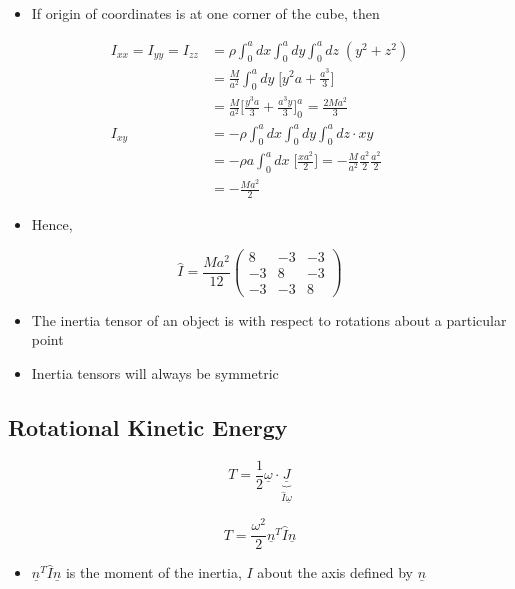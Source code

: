 \documentclass[a4paper,11pt,normalem]{article}
\begin{document}
\begin{example}
\begin{itemize}
\item
  If origin of coordinates is at one corner of the cube, then
\end{itemize}

\[
    \begin{aligned}
    I_{xx} = I_{yy} = I_{zz} &= \rho \int_0^a dx \int_0^a dy \int_0^a dz \;(y^2 + z^2) \\
    &= \frac{M}{a^2} \int_0^a dy \; \Bigg[y^2 a + \frac{a^3}{3}\Bigg] \\
    &= \frac{M}{a^2} \Bigg[\frac{y^3 a}{3} + \frac{a^3 y}{3}\Bigg]_{0}^{a_{}} = \frac{2Ma^2}{3} \\
    I_{xy} &= -\rho \int_0^a dx \int_0^a dy \int_0^a dz \cdot xy \\
    &= -\rho a \int_0^a dx \; \Bigg[\frac{xa^2}{2}\Bigg] = -\frac{M}{a^2}\frac{a^2}{2}\frac{a^2}{2} \\
    &= -\frac{Ma^2}{2}
    \end{aligned}
\]

\begin{itemize}
\item
  Hence,
\end{itemize}

\[
    \hat{I} = \frac{Ma^2}{12 }\begin{pmatrix} 8 & -3 & -3 \\ -3 & 8 & -3 \\ -3 & -3 & 8 \end{pmatrix}
\]

\begin{itemize}
\item
  The inertia tensor of an object is with respect to rotations about a
  particular point
\item
  Inertia tensors will always be symmetric
\end{itemize}
\end{example}

\subsection{Rotational Kinetic Energy}\label{rotational-kinetic-energy}

\[
    T = \frac{1}{2}\underline{\omega} \cdot \underbrace{\underline{J}}_{\hat{I}\underline{\omega}}
\]

\[
    T = \frac{\omega^2}{2}\underline{n}^T \hat{I} \underline{n}
\]

\begin{itemize}
\item
  \(\underline{n}^T \hat{I} \underline{n}\) is the moment of the
  inertia, \(I\) about the axis defined by \(\underline{n}\)
\end{itemize}
\end{document}

